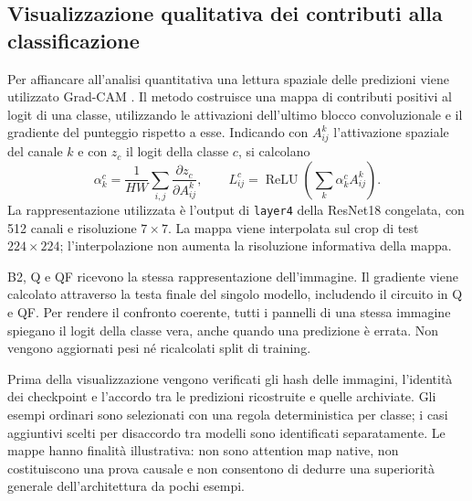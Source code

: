 \subsection{Visualizzazione qualitativa dei contributi alla classificazione}

Per affiancare all'analisi quantitativa una lettura spaziale delle
predizioni viene utilizzato Grad-CAM \cite{selvaraju2017gradcam}.
Il metodo costruisce una mappa di contributi positivi al logit
di una classe, utilizzando le attivazioni dell'ultimo blocco
convoluzionale e il gradiente del punteggio rispetto a esse.
Indicando con \(A^k_{ij}\) l'attivazione spaziale del canale \(k\)
e con \(z_c\) il logit della classe \(c\), si calcolano
\[
 \alpha_k^c=\frac{1}{HW}\sum_{i,j}
       \frac{\partial z_c}{\partial A^k_{ij}},
 \qquad
 L^c_{ij}=\operatorname{ReLU}\left(\sum_k\alpha_k^c A^k_{ij}\right).
\]
La rappresentazione utilizzata è l'output di \texttt{layer4}
della ResNet18 congelata, con 512 canali e risoluzione \(7\times7\).
La mappa viene interpolata sul crop di test \(224\times224\);
l'interpolazione non aumenta la risoluzione informativa della mappa.

B2, Q e QF ricevono la stessa rappresentazione dell'immagine.
Il gradiente viene calcolato attraverso la testa finale del singolo
modello, includendo il circuito in Q e QF. Per rendere il confronto
coerente, tutti i pannelli di una stessa immagine spiegano il logit
della classe vera, anche quando una predizione è errata.
Non vengono aggiornati pesi né ricalcolati split di training.

Prima della visualizzazione vengono verificati gli hash delle
immagini, l'identità dei checkpoint e l'accordo tra le predizioni
ricostruite e quelle archiviate. Gli esempi ordinari sono selezionati
con una regola deterministica per classe; i casi aggiuntivi scelti
per disaccordo tra modelli sono identificati separatamente.
Le mappe hanno finalità illustrativa: non sono attention map
native, non costituiscono una prova causale e non consentono
di dedurre una superiorità generale dell'architettura da pochi esempi.
